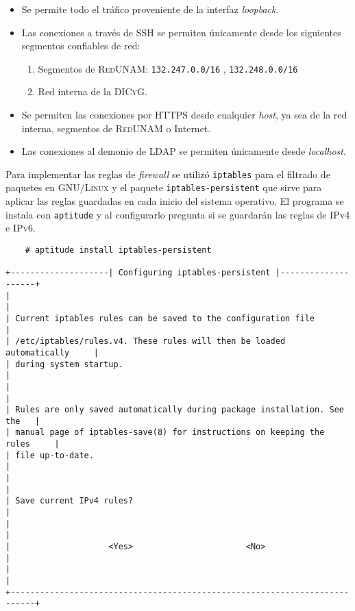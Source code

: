 \begin{itemize}
  \item Se permite todo el tr\'{a}fico proveniente de la interfaz \emph{\gls{loopback}}.
  \item Las conexiones a trav\'{e}s de \textsc{\gls{SSH}} se permiten \'{u}nicamente desde los siguientes segmentos confiables de red:
  \begin{enumerate}
    \item Segmentos de \textsc{RedUNAM}: \texttt{132.247.0.0/16} , \texttt{132.248.0.0/16}
    \item Red interna de la \textsc{DICyG}.
  \end{enumerate}
  \item Se permiten las conexiones por \textsc{\gls{HTTPS}} desde cualquier \emph{\gls{host}}, ya sea de la red interna, segmentos de \textsc{RedUNAM} o Internet.
  \item Las conexiones al demonio de \textsc{\gls{LDAP}} se permiten \'{u}nicamente desde \emph{\gls{localhost}}.
\end{itemize}

Para implementar las reglas de \emph{\gls{firewall}} se utiliz\'{o} \texttt{iptables} para el filtrado de paquetes en \textsc{GNU/Linux} y el paquete \texttt{iptables-persistent} que sirve para aplicar las reglas guardadas en cada inicio del sistema operativo. El programa se instala con \texttt{aptitude} y al configurarlo pregunta si se guardar\'{a}n las reglas de \textsc{IPv4} e \textsc{IPv6}.

{
\scriptsize
\linespread{1}
\begin{verbatim}
    # aptitude install iptables-persistent

+--------------------| Configuring iptables-persistent |--------------------+
|                                                                           |
| Current iptables rules can be saved to the configuration file             |
| /etc/iptables/rules.v4. These rules will then be loaded automatically     |
| during system startup.                                                    |
|                                                                           |
| Rules are only saved automatically during package installation. See the   |
| manual page of iptables-save(8) for instructions on keeping the rules     |
| file up-to-date.                                                          |
|                                                                           |
| Save current IPv4 rules?                                                  |
|                                                                           |
|                    <Yes>                       <No>                       |
|                                                                           |
+---------------------------------------------------------------------------+
\end{verbatim}
}

